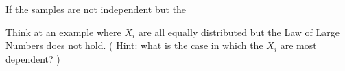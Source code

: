 %
%
%
%
      	
	
	If the samples are not independent but the 
      	\begin{ExerciseList}
      		\Exercise Think at an example where $X_i$ are all equally distributed but the Law of Large Numbers does not hold. ( Hint: what is the case in which the $X_i$ are most dependent? )
      	\end{ExerciseList}
      	
